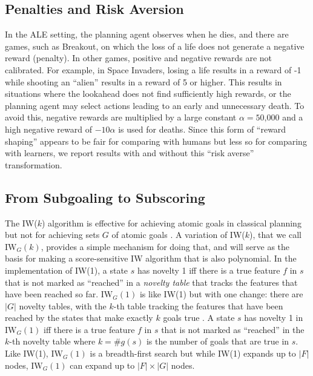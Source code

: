 \documentclass[letterpaper]{article}
\begin{document}
\subsection{Penalties and Risk Aversion}

In the ALE setting, the planning agent observes when he dies, and there are games, such as
Breakout, on which the loss of a life does not generate a negative reward (penalty).
In other games, positive and negative rewards are not calibrated. For example, in
Space Invaders, losing a life  results in a reward of -1 while shooting
an  ``alien'' results in  a reward  of 5 or higher. This results in  situations
where the lookahead does not find sufficiently high rewards, or the planning agent may select
actions leading to an early and unnecessary death. To avoid this,  negative rewards
are multiplied by a large constant $\alpha=\text{50,000}$ and a high negative reward  of $-10\alpha$ is
used for deaths.  Since this form of ``reward shaping'' appears to be fair for comparing with humans
but less so for comparing with learners, we report results with and without this ``risk averse'' transformation.

\subsection{From Subgoaling to Subscoring}

The IW($k$) algorithm is effective for achieving atomic goals in classical planning but
not for achieving sets $G$ of atomic goals \cite{nir:ecai2012}. A variation of IW($k$),
that we call $\textrm{IW}_G(k)$, provides a simple mechanism for doing that, and will
serve as the basis for making a score-sensitive IW algorithm that is also polynomial.
In the implementation of IW(1), a state $s$ has novelty 1 iff there is a true feature $f$
in $s$ that is not marked as ``reached''  in a \emph{novelty table} that tracks the
features that have been reached so far.
$\textrm{IW}_G(1)$ is like IW(1) but with one change: there are $|G|$ novelty tables,
with the $k$-th table tracking the features that have been reached by the states that
make exactly $k$ goals true \cite{nir:aaai2017}.
A state $s$ has novelty 1 in $\textrm{IW}_G(1)$ iff there is a true feature $f$ in $s$
that is not marked as ``reached'' in the $k$-th novelty table where  $k=\#g(s)$ is the
number of goals that are true in $s$.
Like IW(1), $\textrm{IW}_G(1)$ is a breadth-first search but while IW(1) expands up to
$|F|$ nodes,  $\textrm{IW}_G(1)$ can expand up to $|F| \times |G|$ nodes.
\end{document}
